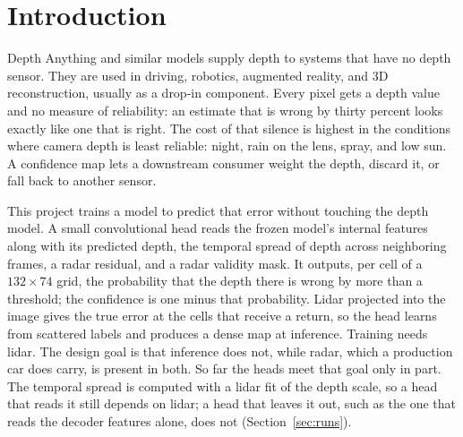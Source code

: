 \section{Introduction}

Depth Anything and similar models supply depth to systems that have no depth sensor. They are used in driving, robotics, augmented reality, and 3D reconstruction, usually as a drop-in component. Every pixel gets a depth value and no measure of reliability: an estimate that is wrong by thirty percent looks exactly like one that is right. The cost of that silence is highest in the conditions where camera depth is least reliable: night, rain on the lens, spray, and low sun. A confidence map lets a downstream consumer weight the depth, discard it, or fall back to another sensor.

This project trains a model to predict that error without touching the depth model. A small convolutional head reads the frozen model's internal features along with its predicted depth, the temporal spread of depth across neighboring frames, a radar residual, and a radar validity mask. It outputs, per cell of a $132 \times 74$ grid, the probability that the depth there is wrong by more than a threshold; the confidence is one minus that probability. Lidar projected into the image gives the true error at the cells that receive a return, so the head learns from scattered labels and produces a dense map at inference. Training needs lidar. The design goal is that inference does not, while radar, which a production car does carry, is present in both. So far the heads meet that goal only in part. The temporal spread is computed with a lidar fit of the depth scale, so a head that reads it still depends on lidar; a head that leaves it out, such as the one that reads the decoder features alone, does not (Section~\ref{sec:runs}).
